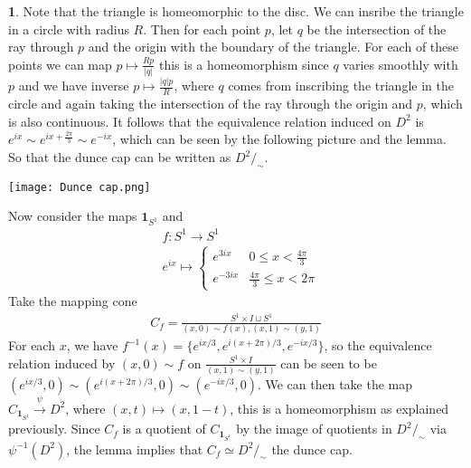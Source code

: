 \documentclass[10.5pt]{article}
\theoremstyle{definition}
\newtheorem{pb}{}
\newcommand{\set}[1]{\{#1\}}
\newcommand{\abs}[1]{\lvert#1\rvert}
\newcommand{\ism}{\simeq}
\begin{document}
    \begin{pb}
        Note that the triangle is homeomorphic to the disc. We can insribe the triangle in a circle with radius \(R\). Then for each point \(p\), let \(q\) be the intersection
        of the ray through \(p \) and the origin with the boundary of the triangle. For each of these points we can map \(p \mapsto \frac{Rp }{\abs{q }}\) this is a homeomorphism
        since \(q\) varies smoothly with \(p\) and we have inverse \(p \mapsto \frac{\abs{q}p}{R}\), where \(q\) comes from inscribing the triangle in the circle and again taking the intersection of
        the ray through the origin and \(p\), which is also continuous.
        It follows that the equivalence relation induced on \(D^2\) is \(e^{ix} \sim e^{ix + \frac{2\pi}{3}} \sim e^{-ix}\), which can be seen by the following picture and the lemma. So that
        the dunce cap can be written as \(D^2/_\sim\).
        \begin{center}
            \texttt{[image: Dunce cap.png]}
        \end{center}

        Now consider the maps \(\mathbf{1}_{S^1}\) and
        \begin{align*}
            &f:S^1 \to S^1 \\
            &e^{ix} \mapsto \begin{cases}
                e^{3ix} & 0 \leq x < \frac{4\pi}{3} \\
                e^{-3ix} & \frac{4\pi}{3} \leq x < 2\pi
            \end{cases}
        \end{align*}
        Take the mapping cone 
        \begin{align*}
            C_f = \frac{S^1 \times I \sqcup S^1}{(x,0) \sim f(x), (x,1) \sim (y,1)}
        \end{align*}
        For each \(x\), we have \(f^{-1}(x) = \set{e^{ix/3},e^{i(x + 2\pi)/3},e^{-ix/3}}\), so the equivalence relation induced by \((x,0) \sim f\) on \(\frac{S^1 \times I}{(x,1) \sim (y,1)}\) can be seen to be 
        \((e^{ix/3},0)\sim (e^{i(x + 2\pi)/3},0)\sim (e^{-ix/3},0)\). 
        We can then take the map \(C_{\mathbf{1}_{S^1}} \overset{\psi}{\to} D^2\), where \((x,t) \mapsto (x,1-t)\), this is a homeomorphism as explained previously. 
        Since \(C_f\) is a quotient of \(C_{\mathbf{1}_{S^1}}\) by the image of quotients in \(D^2/_\sim\) via \(\psi^{-1}(D^2)\), the lemma implies that \(C_f \ism D^2/_\sim\) the dunce cap.


\end{pb}
\end{document}
